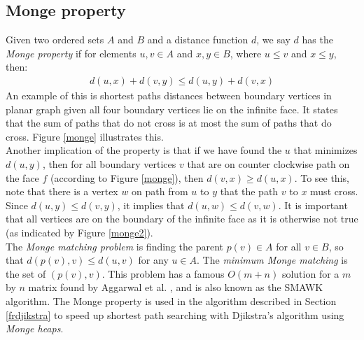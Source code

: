 \subsection{Monge property}
Given two ordered sets $A$ and $B$ and a distance function $d$, we say $d$ has the
\textit{Monge property} if for elements $u, v\in A$ and $x, y\in B$, where
$u\leq v$ and $x\leq y$, then:
\begin{align*}
  d(u,x)+d(v,y)\leq d(u, y)+d(v,x)
\end{align*}
An example of this is shortest paths distances between boundary vertices in planar graph
given all four boundary vertices lie on the infinite face. It states that the sum of
paths that do not cross is at most the sum of paths that do cross. Figure \ref{monge}
illustrates this. \\
Another implication of the property is that if we have found the $u$ that minimizes $d(u,y)$,
then for all boundary vertices $v$ that are on  counter clockwise path on the face $f$
(according to Figure \ref{monge}), then $d(v,x)\geq d(u,x)$. To see this, note that there
is a vertex $w$ on path from $u$ to $y$ that the path $v$ to $x$ must cross. Since
$d(u,y)\leq d(v,y)$, it implies that $d(u,w)\leq d(v,w)$. It is important that all
vertices are on the boundary of the infinite face as it is otherwise not true (as indicated by
Figure \ref{monge2}). \\
The \textit{Monge matching problem} is finding the parent $p(v)\in A$ for all $v\in B$,
so that $d(p(v), v)\leq d(u,v)$ for any $u\in A$. The \textit{minimum Monge matching} is
the set of $(p(v), v)$. This problem has a famous $O(m+n)$ solution for a $m$ by $n$ matrix found by Aggarwal et al.
\cite{aggarwal1987geometric}, and is also known as the SMAWK algorithm. The Monge property is used in the algorithm described in Section
\ref{frdjikstra} to speed up shortest path searching with Djikstra's algorithm using
\textit{Monge heaps}.

